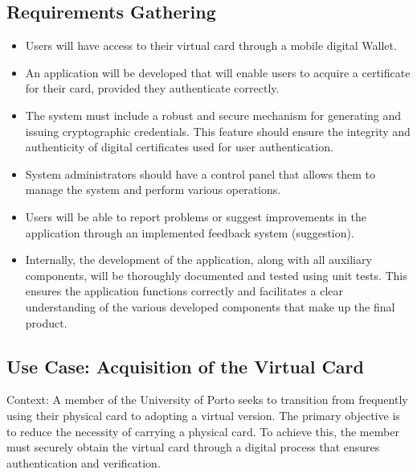 \documentclass[10pt]{article}
\begin{document}
\subsection{Requirements Gathering}
\begin{itemize}
  \item Users will have access to their virtual card through a mobile digital Wallet.
  \item An application will be developed that will enable users to acquire a certificate for their card, provided they authenticate correctly.
  \item The system must include a robust and secure mechanism for generating and issuing cryptographic credentials. This feature should ensure the integrity and authenticity of digital certificates used for user authentication.
  \item System administrators should have a control panel that allows them to manage the system and perform various operations.
  \item Users will be able to report problems or suggest improvements in the application through an implemented feedback system (suggestion).
  \item Internally, the development of the application, along with all auxiliary components, will be thoroughly documented and tested using unit tests. This ensures the application functions correctly and facilitates a clear understanding of the various developed components that make up the final product.
\end{itemize}

\subsection{Use Case: Acquisition of the Virtual Card}
Context: A member of the University of Porto seeks to transition from frequently using their physical card to adopting a virtual version. The primary objective is to reduce the necessity of carrying a physical card. To achieve this, the member must securely obtain the virtual card through a digital process that ensures authentication and verification.
\end{document}
